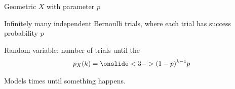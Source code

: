 \begin{frame}{Geometric $X$ with parameter $p$}

{
\plitemsep 0.1in
\bci 
\item<1-> Infinitely many independent Bernoulli trials, where each trial has success probability $p$

\item<2-> Random variable: number of trials until the  
$$
p_X(k) =  \onslide<3->{(1-p)^{k-1} p}
$$

\item<4-> Models  times until something happens. 
\eci 
}
{
}
\end{frame}

